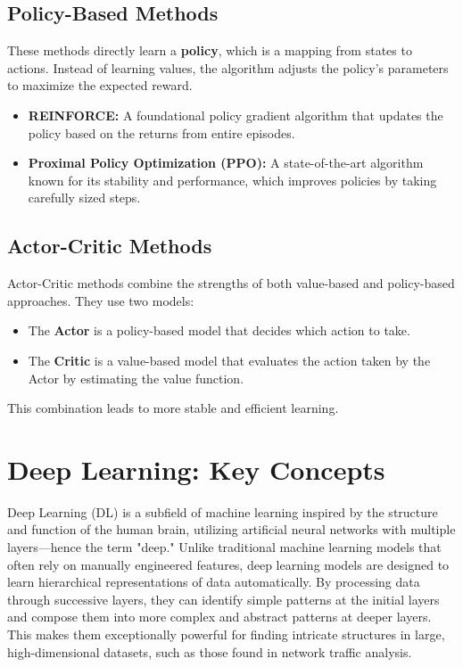 \documentclass[16pt]{report}
\begin{document}
\subsection{Policy-Based Methods}
These methods directly learn a \textbf{policy}, which is a mapping from states to actions. Instead of learning values, the algorithm adjusts the policy's parameters to maximize the expected reward.
\begin{itemize}
    \item \textbf{REINFORCE:} A foundational policy gradient algorithm that updates the policy based on the returns from entire episodes.
    \item \textbf{Proximal Policy Optimization (PPO):} A state-of-the-art algorithm known for its stability and performance, which improves policies by taking carefully sized steps.
\end{itemize}

\subsection{Actor-Critic Methods}
Actor-Critic methods combine the strengths of both value-based and policy-based approaches. They use two models:
\begin{itemize}
    \item The \textbf{Actor} is a policy-based model that decides which action to take.
    \item The \textbf{Critic} is a value-based model that evaluates the action taken by the Actor by estimating the value function.
\end{itemize}
This combination leads to more stable and efficient learning.
\section{Deep Learning: Key Concepts}
Deep Learning (DL) is a subfield of machine learning inspired by the structure and function of the human brain, utilizing artificial neural networks with multiple layers—hence the term "deep." Unlike traditional machine learning models that often rely on manually engineered features, deep learning models are designed to learn hierarchical representations of data automatically. By processing data through successive layers, they can identify simple patterns at the initial layers and compose them into more complex and abstract patterns at deeper layers. This makes them exceptionally powerful for finding intricate structures in large, high-dimensional datasets, such as those found in network traffic analysis.
\end{document}
